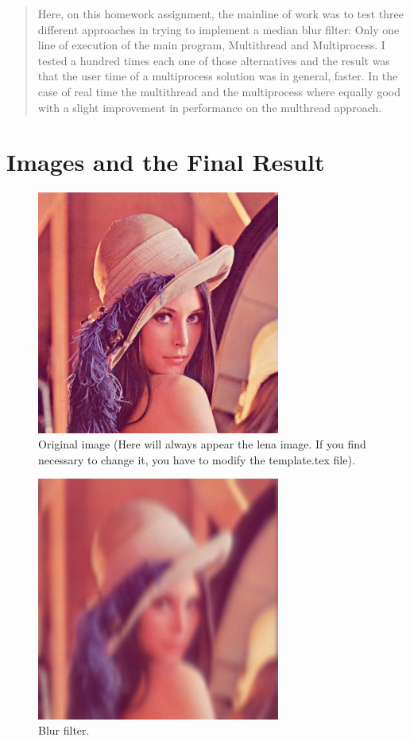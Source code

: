 \documentclass[12pt]{article}
\begin{document}
\maketitle

\begin{abstract}
    Here, on this homework assignment, the mainline of work was to test three different approaches in trying to implement a median
    blur filter: Only one line of execution of the main program, Multithread and Multiprocess. I tested a hundred times each one of those
    alternatives and the result was that the user time of a multiprocess solution was in general, faster. In the case of real time the multithread and
    the multiprocess where equally good with a slight improvement in performance on the multhread approach.
\end{abstract}

\section{Images and the Final Result}
     \begin{figure}[H]
         \caption{Original image (Here will always appear the lena image. If you find necessary to change it, you have to modify the template.tex file).}
        \centering
        \includegraphics[width=8cm]{data/lena.jpg}
    \end{figure}
    \begin{figure}[H]
        \caption{Blur filter.}
        \centering
        \includegraphics[width=8cm]{data/out.jpg}
    \end{figure}
\end{document}
